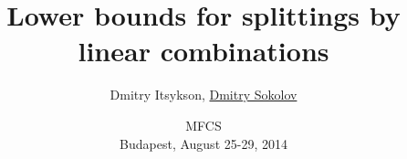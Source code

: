 

\title[\insertframenumber/\inserttotalframenumber~|~
Lower bounds for splittings by linear combinations]
{Lower bounds for splittings by linear combinations}
\author[Sokolov D.O]{Dmitry Itsykson, \underline{Dmitry Sokolov}}

\date{MFCS\\
	Budapest, August 25-29, 2014}



	\maketitle

	
    
    



